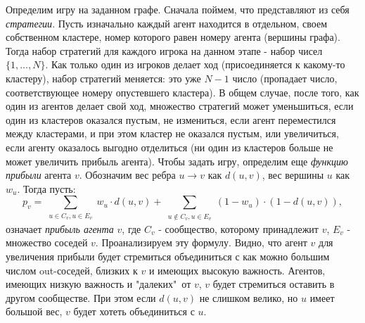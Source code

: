 Определим игру на заданном графе. Сначала поймем, что представляют из себя \textit{стратегии}. Пусть изначально каждый агент находится в отдельном, своем собственном кластере, номер которого равен номеру агента (вершины графа). Тогда набор стратегий для каждого игрока на данном этапе - набор чисел $\{1,\dots,N\}$. Как только один из игроков делает ход (присоединяется к какому-то кластеру), набор стратегий меняется: это уже $N-1$ число (пропадает число, соответствующее номеру опустевшего кластера). В общем случае, после того, как один из агентов делает свой ход, множество стратегий может уменьшиться, если один из кластеров оказался пустым, не измениться, если агент переместился между кластерами, и при этом кластер не оказался пустым, или увеличиться, если агенту оказалось выгодно отделиться (ни один из кластеров больше не может увеличить прибыль агента). Чтобы задать игру, определим еще \textit{функцию прибыли} агента $v$. Обозначим вес ребра $u\rightarrow v$ как $d(u, v)$, вес вершины $u$ как $w_u$. Тогда пусть:
\begin{equation}
p_v = \sum_{\substack{u\in{C_v}, u\in{E_v}}} w_u\cdot d(u, v) + \sum_{\substack{u\notin{C_v}, u\in{E_v}}} (1-w_u)\cdot(1-d(u, v)),
\end{equation}
означает \textit{прибыль агента} $v$, где $C_v$ - сообщество, которому принадлежит $v$, $E_v$ - множество соседей $v$. Проанализируем эту формулу. Видно, что агент $v$ для увеличения прибыли будет стремиться объединиться с как можно большим числом out-соседей, близких к $v$ и имеющих высокую важность. Агентов, имеющих низкую важность и "далеких"\ от $v$, $v$ будет стремиться оставить в другом сообществе. При этом если $d(u, v)$ не слишком велико, но $u$ имеет большой вес, $v$ будет хотеть объединиться с $u$.  \\

